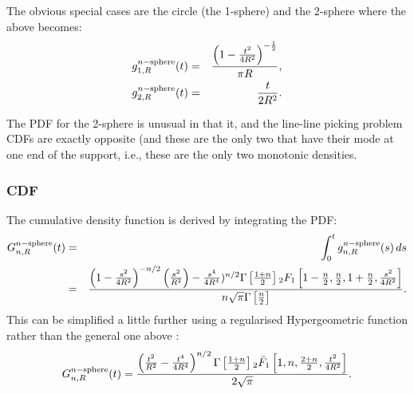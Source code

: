The obvious special cases are the circle (the 1-sphere) and the 2-sphere where the
above becomes:
\begin{eqnarray}
  g^{n-{\rm sphere}}_{1,R}(t) 
   & = &\frac{\left(1 -\frac{t^2}{4 R^2}\right)^{-\frac{1}{2}}}{\pi R}, \\
  g^{n-{\rm sphere}}_{2,R}(t) 
   & = &\frac{t}{2 R^2}.
\end{eqnarray}

The PDF for the 2-sphere is unusual in that it, and the line-line
picking problem CDFs are exactly opposite (and these are the only two
that have their mode at one end of the support, i.e., these are the
only two monotonic densities.



\subsubsection{CDF}

The cumulative density function is derived by integrating the PDF:
\begin{eqnarray}
G^{n-{\rm sphere}}_{n,R}(t)
       & = & \int_0^t g^{n-{\rm sphere}}_{n,R}(s) \, ds \nonumber \\
       & = & \frac{ \left(1-\frac{s^2}{4 R^2}\right)^{-n/2} 
                    \left( \frac{s^2}{R^2} \right)
                   -\frac{s^4}{4 R^4})^{n/2} 
                    \Gamma \left[\frac{1+n}{2}\right] {}_{2}F_{1} 
                    \left[ 1-\frac{n}{2},\frac{n}{2},1+\frac{n}{2},\frac{s^2}{4 R^2} \right]
                  }{n \sqrt{\pi } \Gamma \left[ \frac{n}{2} \right] }.
\end{eqnarray}
This can be simplified a little further using a regularised
Hypergeometric function rather than the general one above :
\begin{equation}
G^{n-{\rm sphere}}_{n,R}(t) = 
      \frac{\left(\frac{t^2}{R^2} -\frac{t^4}{4 R^4}\right)^{n/2}
            \Gamma\left[\frac{1+n}{2}\right]
             {}_{2}\bar{F}_{1}\left[1,n,\frac{2+n}{2},\frac{t^2}{4
                 R^2}\right]
           }{2 \sqrt{\pi }}.
\end{equation}


